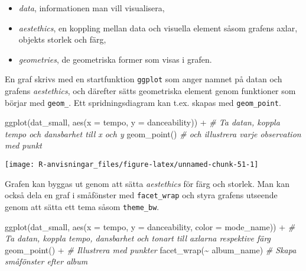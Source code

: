 \documentclass[
]{book}
\newenvironment{Shaded}{\begin{snugshade}}{\end{snugshade}}
\newcommand{\AttributeTok}[1]{\textcolor[rgb]{0.77,0.63,0.00}{#1}}
\newcommand{\CommentTok}[1]{\textcolor[rgb]{0.56,0.35,0.01}{\textit{#1}}}
\newcommand{\FunctionTok}[1]{\textcolor[rgb]{0.00,0.00,0.00}{#1}}
\newcommand{\NormalTok}[1]{#1}
\newcommand{\SpecialCharTok}[1]{\textcolor[rgb]{0.00,0.00,0.00}{#1}}
\providecommand{\tightlist}{%
  \setlength{\itemsep}{0pt}\setlength{\parskip}{0pt}}
\theoremstyle{definition}
\theoremstyle{definition}
\theoremstyle{definition}
\theoremstyle{definition}
\theoremstyle{remark}
\begin{document}
\begin{itemize}
\tightlist
\item
  \emph{data}, informationen man vill visualisera,
\item
  \emph{aestethics}, en koppling mellan data och visuella element såsom grafens axlar, objekts storlek och färg,
\item
  \emph{geometries}, de geometriska former som visas i grafen.
\end{itemize}

En graf skrivs med en startfunktion \texttt{ggplot} som anger namnet på datan och grafens \emph{aestethics}, och därefter sätts geometriska element genom funktioner som börjar med \texttt{geom\_}. Ett spridningsdiagram kan t.ex. skapas med \texttt{geom\_point}.

\begin{Shaded}
\begin{Highlighting}[]
\FunctionTok{ggplot}\NormalTok{(dat\_small, }\FunctionTok{aes}\NormalTok{(}\AttributeTok{x =}\NormalTok{ tempo, }\AttributeTok{y =}\NormalTok{ danceability)) }\SpecialCharTok{+}  \CommentTok{\# Ta datan, koppla tempo och dansbarhet till x och y}
  \FunctionTok{geom\_point}\NormalTok{()                                         }\CommentTok{\# och illustrera varje observation med punkt}
\end{Highlighting}
\end{Shaded}

\begin{center}\texttt{[image: R-anvisningar\_files/figure-latex/unnamed-chunk-51-1]} \end{center}

Grafen kan byggas ut genom att sätta \emph{aestethics} för färg och storlek. Man kan också dela en graf i småfönster med \texttt{facet\_wrap} och styra grafens utseende genom att sätta ett tema såsom \texttt{theme\_bw}.

\begin{Shaded}
\begin{Highlighting}[]
\FunctionTok{ggplot}\NormalTok{(dat\_small, }\FunctionTok{aes}\NormalTok{(}\AttributeTok{x =}\NormalTok{ tempo, }\AttributeTok{y =}\NormalTok{ danceability, }\AttributeTok{color =}\NormalTok{ mode\_name)) }\SpecialCharTok{+}   \CommentTok{\# Ta datan, koppla tempo, dansbarhet och tonart till axlarna respektive färg}
  \FunctionTok{geom\_point}\NormalTok{() }\SpecialCharTok{+}                                                           \CommentTok{\# Illustrera med punkter}
  \FunctionTok{facet\_wrap}\NormalTok{(}\SpecialCharTok{\textasciitilde{}}\NormalTok{ album\_name)                                                 }\CommentTok{\# Skapa småfönster efter album}
\end{Highlighting}
\end{Shaded}
\end{document}
